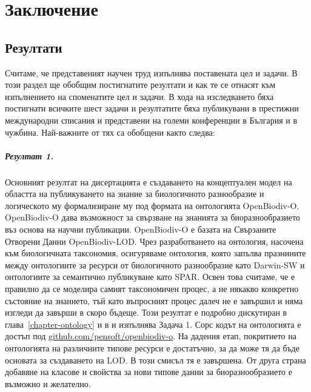 \chapter*{Заключение}
\label{chapter:summary}

\section*{Резултати}

Считаме, че представеният научен труд изпълнява поставената цел и задачи. В този раздел ще обобщим постигнатите резултати и как те се отнасят към изпълнението на споменатите цел и задачи. В хода на изследването бяха постигнати всичките шест задачи и резултатите бяха публикувани в престижни международни списания и представени на големи конференции в България и в чужбина. Най-важните от тях са обобщени както следва:

\paragraph{Резултат 1.} Основният резултат на дисертацията е създаването на концептуален модел на областта на публикуването на знание за биологичното разнообразие и логическото му формализиране му под формата на онтологията OpenBiodiv-O. OpenBiodiv-O дава възможност за свързване на знанията за биоразнообразието въз основа на научни публикации. OpenBiodiv-O е базата на Свързаните Отворени Данни OpenBiodiv-LOD. Чрез разработването на онтология, насочена към биологичната таксономия, осигуряваме онтология, която запълва празнините между онтологиите за ресурси от биологичното разнообразие като Darwin-SW и онтологиите за семантично публикуване като SPAR. Освен това считаме, че е правилно да се моделира самият таксономичен процес, а не някакво конкретно състояние на знанието, тъй като въпросният процес далеч не е завършил и няма изгледи да завърши в скоро бъдеще. Този резултат е подробно дискутиран в глава~\ref{chapter-ontology} и в \cite{senderov_openbiodiv-o:_2018} и изпълнява Задача 1. Сорс кодът на онтологията е достъп под \href{https://github.com/pensoft/openbiodiv-o}{github.com/pensoft/openbiodiv-o}. На дадения етап, покритието на онтологията на различните типове ресурси е достатъчно, за да може тя да бъде основата за създаването на LOD. В този смисъл тя е завършена. От друга страна добавяне на класове и свойства за нови типове данни за биоразнообразието е възможно и желателно.


